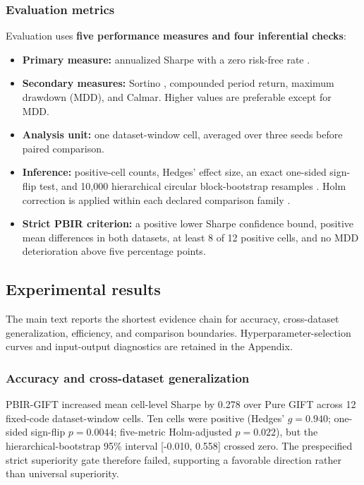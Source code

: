 \documentclass[pdflatex,sn-basic,Numbered]{sn-jnl}
\providecommand{\tightlist}{\setlength{\itemsep}{0pt}\setlength{\parskip}{0pt}}
\begin{document}
\hypertarget{evaluation-metrics}{%
\subsubsection{Evaluation metrics}\label{evaluation-metrics}}

Evaluation uses \textbf{five performance measures and four inferential checks}:

\begin{itemize}
\tightlist
\item
  \textbf{Primary measure:} annualized Sharpe with a zero risk-free rate \cite{ref34}.
\item
  \textbf{Secondary measures:} Sortino \cite{ref35}, compounded period return, maximum drawdown (MDD), and Calmar. Higher values are preferable except for MDD.
\item
  \textbf{Analysis unit:} one dataset-window cell, averaged over three seeds before paired comparison.
\item
  \textbf{Inference:} positive-cell counts, Hedges' effect size, an exact one-sided sign-flip test, and 10,000 hierarchical circular block-bootstrap resamples \cite{ref36}. Holm correction is applied within each declared comparison family \cite{ref37}.
\item
  \textbf{Strict PBIR criterion:} a positive lower Sharpe confidence bound, positive mean differences in both datasets, at least 8 of 12 positive cells, and no MDD deterioration above five percentage points.
\end{itemize}

\hypertarget{experimental-results}{%
\subsection{Experimental results}\label{experimental-results}}

The main text reports the shortest evidence chain for accuracy, cross-dataset generalization, efficiency, and comparison boundaries. Hyperparameter-selection curves and input-output diagnostics are retained in the Appendix.

\hypertarget{accuracy-and-cross-dataset-generalization}{%
\subsubsection{Accuracy and cross-dataset generalization}\label{accuracy-and-cross-dataset-generalization}}

PBIR-GIFT increased mean cell-level Sharpe by 0.278 over Pure GIFT across 12 fixed-code dataset-window cells. Ten cells were positive (Hedges' \(g=0.940\); one-sided sign-flip \(p=0.0044\); five-metric Holm-adjusted \(p=0.022\)), but the hierarchical-bootstrap 95\% interval {[}-0.010, 0.558{]} crossed zero. The prespecified strict superiority gate therefore failed, supporting a favorable direction rather than universal superiority.
\end{document}
